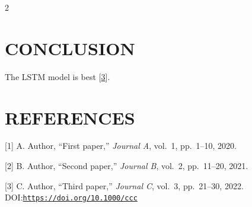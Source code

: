 \documentclass[9pt]{extarticle}
\begin{document}
\begin{multicols}{2}
\section{CONCLUSION}
The LSTM model is best [\hyperlink{ref:3}{3}].

\section*{REFERENCES}
\begin{list}{}{
    \setlength{\leftmargin}{1.5em}
    \setlength{\itemindent}{-1.5em}
    \setlength{\parsep}{0pt}
    \setlength{\itemsep}{6pt}
}
\item \hypertarget{ref:1}{}[1] A. Author, “First paper,” \textit{Journal A}, vol.~1, pp.~1–10, 2020.

\item \hypertarget{ref:2}{}[2] B. Author, “Second paper,” \textit{Journal B}, vol.~2, pp.~11–20, 2021.

\item \hypertarget{ref:3}{}[3] C. Author, “Third paper,” \textit{Journal C}, vol.~3, pp.~21–30, 2022. DOI:\href{https://doi.org/10.1000/ccc}{{\nolinkurl{https://doi.org/10.1000/ccc}}}

\end{list}
\end{multicols}
\end{document}
